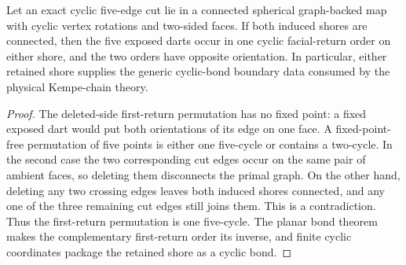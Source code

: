 \begin{lemma}
\label{lem:exact-five-cut-cyclic-boundary}
Let an exact cyclic five-edge cut lie in a connected spherical graph-backed
map with cyclic vertex rotations and two-sided faces.  If both induced shores
are connected, then the five exposed darts occur in one cyclic facial-return
order on either shore, and the two orders have opposite orientation.  In
particular, either retained shore supplies the generic cyclic-bond boundary
data consumed by the physical Kempe-chain theory.
\end{lemma}

\begin{proof}
The deleted-side first-return permutation has no fixed point: a fixed exposed
dart would put both orientations of its edge on one face.  A fixed-point-free
permutation of five points is either one five-cycle or contains a two-cycle.
In the second case the two corresponding cut edges occur on the same pair of
ambient faces, so deleting them disconnects the primal graph.  On the other
hand, deleting any two crossing edges leaves both induced shores connected,
and any one of the three remaining cut edges still joins them.  This is a
contradiction.  Thus the first-return permutation is one five-cycle.  The
planar bond theorem makes the complementary first-return order its inverse,
and finite cyclic coordinates package the retained shore as a cyclic bond.
\end{proof}

